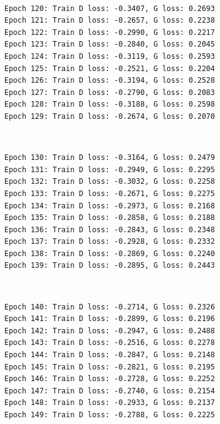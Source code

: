 \documentclass[11pt]{article}
\begin{document}
    \begin{center}
    \end{center}
    { \hspace*{\fill} \\}
    
    \begin{Verbatim}[commandchars=\\\{\}]
Epoch 120: Train D loss: -0.3407, G loss: 0.2693
Epoch 121: Train D loss: -0.2657, G loss: 0.2238
Epoch 122: Train D loss: -0.2990, G loss: 0.2217
Epoch 123: Train D loss: -0.2840, G loss: 0.2045
Epoch 124: Train D loss: -0.3119, G loss: 0.2593
Epoch 125: Train D loss: -0.2521, G loss: 0.2204
Epoch 126: Train D loss: -0.3194, G loss: 0.2528
Epoch 127: Train D loss: -0.2790, G loss: 0.2083
Epoch 128: Train D loss: -0.3188, G loss: 0.2598
Epoch 129: Train D loss: -0.2674, G loss: 0.2070

    \end{Verbatim}

    \begin{center}
    \end{center}
    { \hspace*{\fill} \\}
    
    \begin{Verbatim}[commandchars=\\\{\}]
Epoch 130: Train D loss: -0.3164, G loss: 0.2479
Epoch 131: Train D loss: -0.2949, G loss: 0.2295
Epoch 132: Train D loss: -0.3032, G loss: 0.2258
Epoch 133: Train D loss: -0.2671, G loss: 0.2275
Epoch 134: Train D loss: -0.2973, G loss: 0.2168
Epoch 135: Train D loss: -0.2858, G loss: 0.2188
Epoch 136: Train D loss: -0.2843, G loss: 0.2348
Epoch 137: Train D loss: -0.2928, G loss: 0.2332
Epoch 138: Train D loss: -0.2869, G loss: 0.2240
Epoch 139: Train D loss: -0.2895, G loss: 0.2443

    \end{Verbatim}

    \begin{center}
    \end{center}
    { \hspace*{\fill} \\}
    
    \begin{Verbatim}[commandchars=\\\{\}]
Epoch 140: Train D loss: -0.2714, G loss: 0.2326
Epoch 141: Train D loss: -0.2899, G loss: 0.2196
Epoch 142: Train D loss: -0.2947, G loss: 0.2488
Epoch 143: Train D loss: -0.2516, G loss: 0.2278
Epoch 144: Train D loss: -0.2847, G loss: 0.2148
Epoch 145: Train D loss: -0.2821, G loss: 0.2195
Epoch 146: Train D loss: -0.2728, G loss: 0.2252
Epoch 147: Train D loss: -0.2740, G loss: 0.2154
Epoch 148: Train D loss: -0.2933, G loss: 0.2137
Epoch 149: Train D loss: -0.2788, G loss: 0.2225

    \end{Verbatim}
\end{document}
